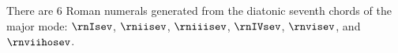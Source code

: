 
There are 6 Roman numerals generated from the diatonic
seventh chords of the major mode: $\rnIsev$, $\rniisev$,
$\rniiisev$, $\rnIVsev$, $\rnvisev$, and $\rnviihosev$.
